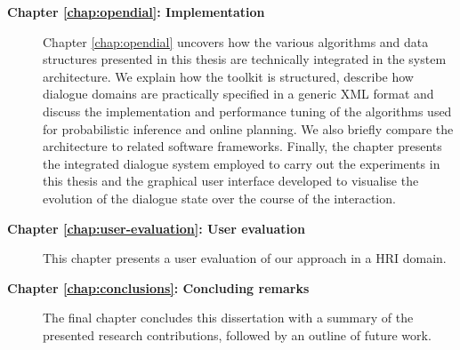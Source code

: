 \begin{description}
\item [\textbf{Chapter \ref{chap:opendial}: Implementation}] \hfill  \vspace{2mm}

Chapter \ref{chap:opendial} uncovers how the various algorithms and data structures presented in this thesis are technically integrated in the system architecture.  We explain how the \opendial toolkit is structured, describe how dialogue domains are practically specified in a generic XML format and discuss the implementation and performance tuning of the algorithms used for probabilistic inference and online planning.  We also briefly compare the \opendial architecture to related software frameworks.  Finally, the chapter presents the integrated dialogue system employed to carry out the experiments in this thesis and the graphical user interface developed to visualise the evolution of the dialogue state over the course of the interaction. 

\item [\textbf{Chapter \ref{chap:user-evaluation}: User evaluation}] \hfill  \vspace{2mm}

This chapter presents a user evaluation of our approach in a HRI domain.     \vspace{2mm}


\item [\textbf{Chapter \ref{chap:conclusions}: Concluding remarks}] \hfill  \vspace{2mm}

The final chapter concludes this dissertation with a summary of the presented research contributions, followed by an outline of future work.   \vspace{2mm}

\end{description}

